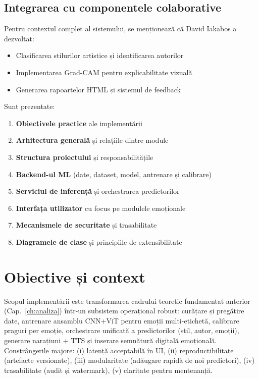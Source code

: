 \subsection*{Integrarea cu componentele colaborative}
Pentru contextul complet al sistemului, se menționează că David Iakabos a dezvoltat:
\begin{itemize}
    \item Clasificarea stilurilor artistice și identificarea autorilor
    \item Implementarea Grad-CAM pentru explicabilitate vizuală
    \item Generarea rapoartelor HTML și sistemul de feedback
\end{itemize}

Sunt prezentate:
\begin{enumerate}
  \item \textbf{Obiectivele practice} ale implementării
  \item \textbf{Arhitectura generală} și relațiile dintre module
  \item \textbf{Structura proiectului} și responsabilitățile
  \item \textbf{Backend-ul ML} (date, dataset, model, antrenare și calibrare)
  \item \textbf{Serviciul de inferență} și orchestrarea predictorilor
  \item \textbf{Interfața utilizator} cu focus pe modulele emoționale
  \item \textbf{Mecanismele de securitate} și trasabilitate
  \item \textbf{Diagramele de clase} și principiile de extensibilitate
\end{enumerate}

\newcommand{\boxblock}[2][0.86\linewidth]{\fbox{\parbox{#1}{\centering #2}}}
\newcommand{\smallbox}[2][0.38\linewidth]{\fbox{\parbox{#1}{\centering #2}}}

\section{Obiective și context}\label{sec:c5-context}
Scopul implementării este transformarea cadrului teoretic fundamentat anterior (Cap.~\ref{ch:analiza}) într-un subsistem operațional robust: curățare și pregătire date, antrenare ansamblu CNN+ViT pentru emoții multi-etichetă, calibrare praguri per emoție, orchestrare unificată a predictorilor (stil, autor, emoții), generare narațiuni + TTS și inserare semnătură digitală emoțională. Constrângerile majore: (i) latență acceptabilă în UI, (ii) reproductibilitate (artefacte versionate), (iii) modularitate (adăugare rapidă de noi predictori), (iv) trasabilitate (audit și watermark), (v) claritate pentru mentenanță.

